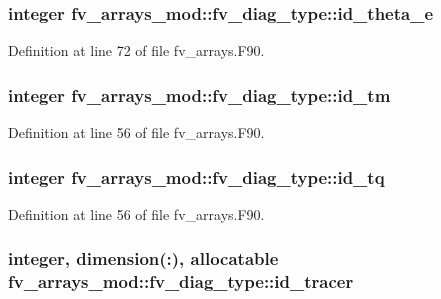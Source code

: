 \subsubsection[{id\-\_\-theta\-\_\-e}]{\setlength{\rightskip}{0pt plus 5cm}integer fv\-\_\-arrays\-\_\-mod\-::fv\-\_\-diag\-\_\-type\-::id\-\_\-theta\-\_\-e}\label{structfv__arrays__mod_1_1fv__diag__type_accaec7406234583e7c9e16f8d7ec010d}


Definition at line 72 of file fv\-\_\-arrays.\-F90.

\subsubsection[{id\-\_\-tm}]{\setlength{\rightskip}{0pt plus 5cm}integer fv\-\_\-arrays\-\_\-mod\-::fv\-\_\-diag\-\_\-type\-::id\-\_\-tm}\label{structfv__arrays__mod_1_1fv__diag__type_a6b7cf6f96193ee0e13156d20ef1d2450}


Definition at line 56 of file fv\-\_\-arrays.\-F90.

\subsubsection[{id\-\_\-tq}]{\setlength{\rightskip}{0pt plus 5cm}integer fv\-\_\-arrays\-\_\-mod\-::fv\-\_\-diag\-\_\-type\-::id\-\_\-tq}\label{structfv__arrays__mod_1_1fv__diag__type_aecd1fab104c31b936b96a4814a934a35}


Definition at line 56 of file fv\-\_\-arrays.\-F90.

\subsubsection[{id\-\_\-tracer}]{\setlength{\rightskip}{0pt plus 5cm}integer, dimension(\-:), allocatable fv\-\_\-arrays\-\_\-mod\-::fv\-\_\-diag\-\_\-type\-::id\-\_\-tracer}\label{structfv__arrays__mod_1_1fv__diag__type_abf748df5449396c1a7074ecb74d7f324}


